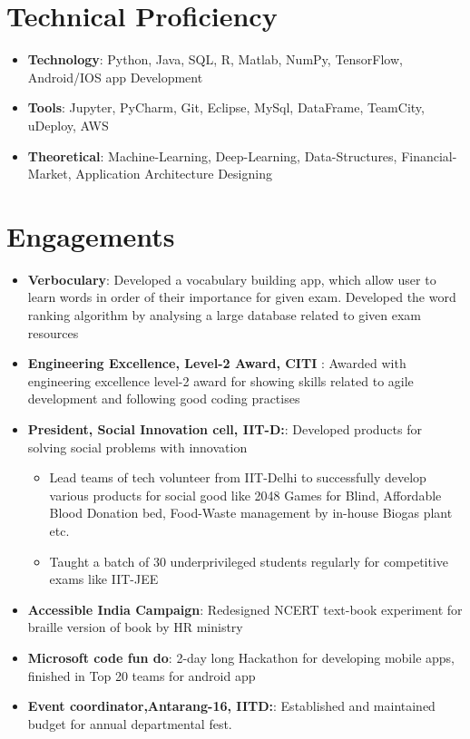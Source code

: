 \documentclass[letterpaper,11pt]{article}
\newcommand{\resumeSubHeadingListStart}{\begin{itemize}[leftmargin=*]}
\newcommand{\resumeSubHeadingListEnd}{\end{itemize}}
\newcommand{\resumeItemListStart}{\begin{itemize}[leftmargin=*]}
\newcommand{\resumeItemListEnd}{\end{itemize}\vspace{-5pt}}
\newcommand{\resumeItem}[2]{
  \item\small{
    \textbf{#1}{: #2 \vspace{-2pt}}
  }
}
\newcommand{\resumeItemPointer}[1]{
  \item\small{
    {#1 \vspace{-2pt}}
  }
}
\newcommand{\resumeSubItem}[2]{
    \resumeItem{#1}{#2}\vspace{-4pt}
}
\begin{document}
\section{Technical Proficiency}
  \resumeSubHeadingListStart
    \resumeSubItem{Technology}
      {Python, Java, SQL, R, Matlab, NumPy, TensorFlow, Android/IOS app Development}
    \resumeSubItem{Tools}
      {Jupyter, PyCharm, Git, Eclipse, MySql, DataFrame, TeamCity, uDeploy, AWS}
    \resumeSubItem{Theoretical}
      {Machine-Learning, Deep-Learning, Data-Structures, Financial-Market, Application Architecture Designing}
  \resumeSubHeadingListEnd




\section{Engagements}
  \resumeSubHeadingListStart
    \resumeSubItem{Verboculary}
      {Developed a vocabulary building app, which allow user to learn words in order of their importance for given exam. Developed the word ranking algorithm by analysing a large database related to given exam resources}
    \resumeSubItem{Engineering Excellence, Level-2 Award, CITI }
      {Awarded with engineering excellence level-2 award for showing skills related to agile development and following good coding practises}
    \resumeSubItem{President, Social Innovation cell, IIT-D:} { Developed products for solving social problems with innovation }
      \resumeItemListStart
        \resumeItemPointer{Lead teams of tech volunteer from IIT-Delhi to successfully develop various products for social good like 2048 Games for Blind, Affordable Blood Donation bed, Food-Waste management by in-house Biogas plant etc.}
        \resumeItemPointer{Taught a batch of 30 underprivileged students regularly for competitive exams like IIT-JEE }
      \resumeItemListEnd
    \resumeSubItem{Accessible India Campaign}
      {Redesigned NCERT text-book experiment for braille version of book by HR ministry}
    \resumeSubItem{Microsoft code fun do}
      {2-day long Hackathon for developing mobile apps, finished in Top 20 teams for android app}
    
    \resumeSubItem{Event coordinator,Antarang-16, IITD:} {Established and maintained budget for annual departmental fest.}

      
  \resumeSubHeadingListEnd
\end{document}

